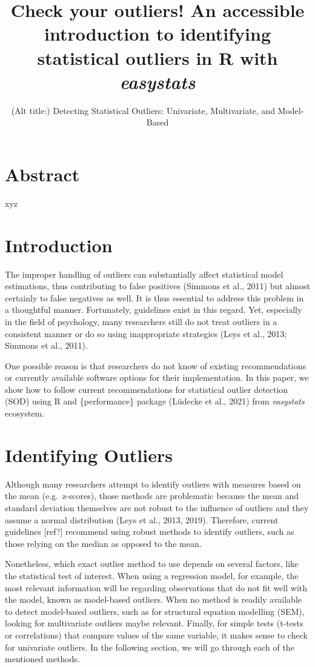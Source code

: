\documentclass[
]{article}
\title{Check your outliers! An accessible introduction to identifying
statistical outliers in R with \emph{easystats}}
\subtitle{(Alt title:) Detecting Statistical Outliers: Univariate,
Multivariate, and Model-Based}
\author{}
\date{\vspace{-2.5em}}
\begin{document}
\maketitle

\hypertarget{abstract}{%
\section{Abstract}\label{abstract}}

xyz

\hypertarget{introduction}{%
\section{Introduction}\label{introduction}}

The improper handling of outliers can substantially affect statistical
model estimations, thus contributing to false positives (Simmons et al.,
2011) but almost certainly to false negatives as well. It is thus
essential to address this problem in a thoughtful manner. Fortunately,
guidelines exist in this regard. Yet, especially in the field of
psychology, many researchers still do not treat outliers in a consistent
manner or do so using inappropriate strategies (Leys et al., 2013;
Simmons et al., 2011).

One possible reason is that researchers do not know of existing
recommendations or currently available software options for their
implementation. In this paper, we show how to follow current
recommendations for statistical outlier detection (SOD) using R and
\{performance\} package (Lüdecke et al., 2021) from \emph{easystats}
ecosystem.

\hypertarget{identifying-outliers}{%
\section{Identifying Outliers}\label{identifying-outliers}}

Although many researchers attempt to identify outliers with measures
based on the mean (e.g.~z-scores), those methods are problematic because
the mean and standard deviation themselves are not robust to the
influence of outliers and they assume a normal distribution (Leys et
al., 2013, 2019). Therefore, current guidelines {[}ref?{]} recommend
using robust methods to identify outliers, such as those relying on the
median as opposed to the mean.

Nonetheless, which exact outlier method to use depends on several
factors, like the statistical test of interest. When using a regression
model, for example, the most relevant information will be regarding
observations that do not fit well with the model, known as model-based
outliers. When no method is readily available to detect model-based
outliers, such as for structural equation modelling (SEM), looking for
multivariate outliers maybe relevant. Finally, for simple tests (t-tests
or correlations) that compare values of the same variable, it makes
sense to check for univariate outliers. In the following section, we
will go through each of the mentioned methods.
\end{document}
